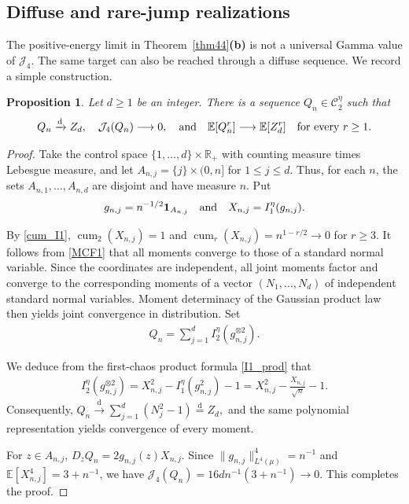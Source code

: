 \documentclass[letterpaper,11pt,reqno]{amsart}
\numberwithin{equation}{section}
\theoremstyle{plain}
\newtheorem{proposition}[theorem]{Proposition}
\theoremstyle{definition}
\theoremstyle{remark}
\newcommand{\E}{\mathbb{E}}
\newcommand{\R}{\mathbb{R}}
\newcommand{\ind}{\mathbf{1}}
\newcommand{\cC}{\mathcal{C}}
\DeclareMathOperator{\cum}{cum}
\newcommand{\noi}{\noindent}
\newcommand{\ot}{\otimes}
\newcommand{\Jfour}{\mathcal J_4}
\newcommand{\AND}{\quad{\rm and}\quad}
\begin{document}
\subsection{Diffuse and rare-jump realizations}
\label{SEC_37}

The positive-energy limit in Theorem~\ref{thm44}{\bf(b)} is not a
universal Gamma value of $\Jfour$.  The same target can also be reached
through a diffuse sequence.  We record a simple construction.

\begin{proposition}
\label{prop_diff_ex}
Let $d\geq1$ be an integer.  There is a
sequence $Q_n\in\cC_2^\eta$ such that
\noi
\begin{align*}
 Q_n\xrightarrow{\mathrm d}Z_d,
 \quad
  \Jfour(Q_n)\longrightarrow0,
  \AND
 \E[Q_n^r] \longrightarrow\E[Z_d^r]
 \quad\text{for every }r\geq1.
\end{align*}
\end{proposition}

\begin{proof}
Take the control space
$\{1,\ldots,d\}\times\R_+$ with counting measure times Lebesgue
measure, and let
$ A_{n,j}=\{j\}\times(0,n]$
for $1\leq j\leq d.$
Thus, for each $n$, the sets $A_{n,1},\ldots,A_{n,d}$ are disjoint
and have measure $n$.  Put
\noi
\begin{align*}
 g_{n,j}=n^{-1/2}\ind_{A_{n,j}}
 \AND
 X_{n,j}=I_1^\eta(g_{n,j}).
\end{align*}

By \eqref{cum_I1},
$ \cum_2(X_{n,j})=1$
and
$ \cum_r(X_{n,j})=n^{1-r/2}\longrightarrow0$
for $r\geq3$.
It follows from \eqref{MCF1} that all moments converge to those of a
standard normal variable.  Since the coordinates are independent, all
joint moments factor and converge to the corresponding moments of a
vector $(N_1,\ldots,N_d)$ of independent standard normal variables.
Moment determinacy of the Gaussian product law then yields joint
convergence in distribution.  Set
\noi
\begin{align*}
 Q_n=\sum_{j=1}^d I_2^\eta(g_{n,j}^{\ot2}).
\end{align*}

We deduce from the first-chaos product formula \eqref{I1_prod} that
\noi
\begin{align*}
 I_2^\eta(g_{n,j}^{\ot2})
 =X_{n,j}^2-I_1^\eta(g_{n,j}^2)-1
 =X_{n,j}^2-\frac{X_{n,j}}{\sqrt n}-1.
\end{align*}
Consequently,
$
 Q_n\xrightarrow{\mathrm d}
 \sum_{j=1}^d(N_j^2-1)
 \stackrel{\mathrm d}=Z_d,
$
and the same polynomial representation yields convergence of every
moment.

For $z\in A_{n,j}$,
$D_zQ_n=2g_{n,j}(z)X_{n,j}$.
Since $\|g_{n,j}\|_{L^4(\mu)}^4=n^{-1}$ and
$\E[X_{n,j}^4]=3+n^{-1}$,
we have
$\Jfour(Q_n)=16d n^{-1}(3+n^{-1})\to0$.  This completes the
proof.
\end{proof}
\end{document}
